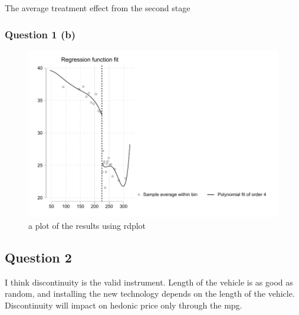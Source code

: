 \documentclass{article}
\begin{document}
\begin{table}[ht]
    \centering
    
    \caption{The average treatment effect from the second stage}
    \label{tab:Rd_2sls_stata}
\end{table}

\newpage

\subsubsection{Question 1 (b) }

\begin{figure}[ht]
    \centering
    \includegraphics[scale = 0.7]{rdplot_stata.pdf}
    \caption{a plot of the results using rdplot}
    \label{fig:rdplot_stata}
\end{figure}

\newpage

\subsection{Question 2 }
I think discontinuity is the valid instrument. Length of the vehicle is as good as random, and installing the new technology depends on the length of the vehicle. Discontinuity will impact on hedonic price only through the mpg. 
\end{document}
